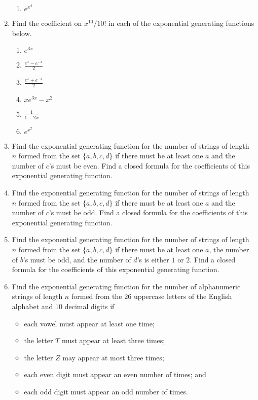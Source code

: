 \begin{enumerate}
\begin{multicols}{4}
\begin{enumerate}
    \item $e^{x^4}$
    \end{enumerate}
  \end{multicols}
\item Find the coefficient on $x^{10}/{10!}$ in each of the
  exponential generating functions below.
  \begin{multicols}{3}
    \begin{enumerate}
    \item $e^{3x}$
    \item $\displaystyle\frac{e^x-e^{-x}}{2}$
    \item $\displaystyle\frac{e^x+e^{-x}}{2}$
    \item $xe^{3x}-x^2$
    \item $\displaystyle\frac{1}{1-2x}$
    \item $e^{x^2}$
    \end{enumerate}
  \end{multicols}
\item Find the exponential generating function for the number of
  strings of length $n$ formed from the set $\{a,b,c,d\}$ if there
  must be at least one $a$ and the number of $c$'s must be even. Find
  a closed formula for the coefficients of this exponential generating
  function.
\item Find the exponential generating function for the number of
  strings of length $n$ formed from the set $\{a,b,c,d\}$ if there
  must be at least one $a$ and the number of $c$'s must be odd. Find a
  closed formula for the coefficients of this exponential generating
  function.
\item Find the exponential generating function for the number of
  strings of length $n$ formed from the set $\{a,b,c,d\}$ if there
  must be at least one $a$, the number of $b$'s must be odd, and the
  number of $d$'s is either $1$ or $2$. Find a closed formula for the
  coefficients of this exponential generating function.
\item Find the exponential generating function for the number of
  alphanumeric strings of length $n$ formed from the $26$ uppercase
  letters of the English alphabet and $10$ decimal digits if
  \begin{itemize}
  \item each vowel must appear at least one time;
  \item the letter $T$ must appear at least three times;
  \item the letter $Z$ may appear at most three times;
  \item each even digit must appear an even number of times; and
  \item each odd digit must appear an odd number of times.
  \end{itemize}

\end{enumerate}

